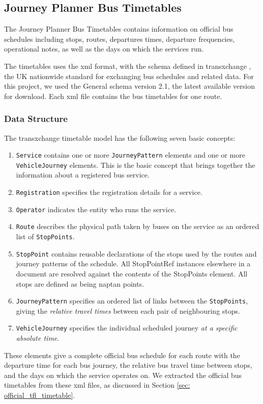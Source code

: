 \subsection{Journey Planner Bus Timetables}
The Journey Planner Bus Timetables \cite{open_data_feeds_description} contains information on official bus schedules including stops, routes, departures times, departure frequencies, operational notes, as well as the days on which the services run.

The timetables uses the \acrfull{xml} \cite{xml} format, with the schema defined in \gls{transxchange} \cite{transxchange}, the UK nationwide standard for exchanging bus schedules and related data. For this project, we used the General schema version 2.1\cite{transxchange_downloads_and_schema}\cite{transxchange_schema_2.1_xsd}, the latest available version for download. Each \acrshort{xml} file contains the bus timetables for one route.

\subsubsection{Data Structure}
The \gls{transxchange} timetable model has the following seven basic concepts\cite{transxchange_schema_guide}:

\begin{enumerate}
  \item \texttt{Service} contains one or more \texttt{JourneyPattern} elements and one or more \texttt{VehicleJourney} elements. This is the basic concept that brings together the information about a registered bus service.
  \item \texttt{Registration} specifies the registration details for a service.
  \item \texttt{Operator} indicates the entity who runs the service.
  \item \texttt{Route} describes the physical path taken by buses on the service as an ordered list of \texttt{StopPoints}.
  \item \texttt{StopPoint} contains reusable declarations of the stops used by the routes and journey patterns of the schedule. All StopPointRef instances elsewhere in a document are resolved against the contents of the StopPoints element. All stops are defined as being \gls{naptan} points.
  \item \texttt{JourneyPattern} specifies an ordered list of links between the \texttt{StopPoints}, giving the \emph{relative travel times} between each pair of neighbouring stops.
  \item \texttt{VehicleJourney} specifies the individual scheduled journey \emph{at a specific absolute time}.
\end{enumerate}

These elements give a complete official bus schedule for each route with the departure time for each bus journey, the relative bus travel time between stops, and the days on which the service operates on. We extracted the official bus timetables from these \acrshort{xml} files, as discussed in Section \ref{sec: official_tfl_timetable}.
